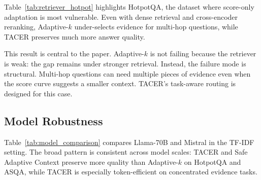 \documentclass[11pt]{article}
\begin{document}
Table~\ref{tab:retriever_hotpot} highlights HotpotQA, the dataset where score-only adaptation is most vulnerable. Even with dense retrieval and cross-encoder reranking, Adaptive-$k$ under-selects evidence for multi-hop questions, while TACER preserves much more answer quality.

\begin{table}[t]
\centering
\small
\caption{HotpotQA under stronger retrievers.}
\label{tab:retriever_hotpot}
\end{table}

This result is central to the paper. Adaptive-$k$ is not failing because the retriever is weak: the gap remains under stronger retrieval. Instead, the failure mode is structural. Multi-hop questions can need multiple pieces of evidence even when the score curve suggests a smaller context. TACER's task-aware routing is designed for this case.

\subsection{Model Robustness}

Table~\ref{tab:model_comparison} compares Llama-70B and Mistral in the TF-IDF setting. The broad pattern is consistent across model scales: TACER and Safe Adaptive Context preserve more quality than Adaptive-$k$ on HotpotQA and ASQA, while TACER is especially token-efficient on concentrated evidence tasks.
\end{document}
